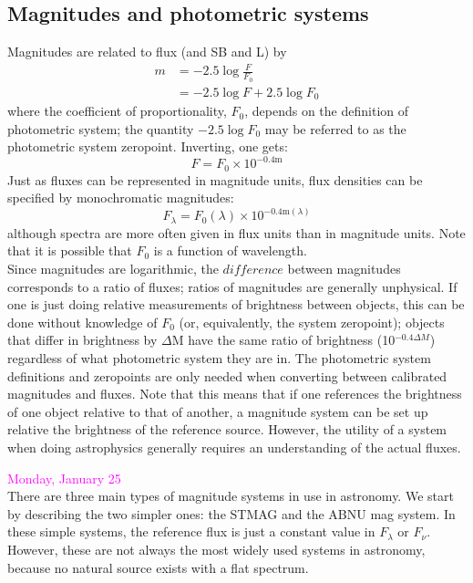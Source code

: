 \documentclass[12pt]{article}
\begin{document}
\subsection*{Magnitudes and photometric systems}
Magnitudes are related to flux (and SB and L) by
\begin{align*}
    m &= -2.5 \log \frac{F}{F_0}\\
      &= -2.5 \log F + 2.5 \log F_0
\end{align*}
where the coefficient of proportionality, $F_0$, depends on the definition
of photometric system; the quantity $-2.5 \log F_0$ may be referred to as
the photometric system zeropoint. Inverting, one gets:
\begin{equation*}
    F = F_0 \times 10^{-0.4\textrm{m}}
\end{equation*}
Just as fluxes can be represented in magnitude units, flux densities can be
specified by monochromatic magnitudes:
\begin{equation*}
    F_{\lambda} = F_0 (\lambda) \times 10^{-0.4 \textrm{m}(\lambda)}
\end{equation*}
although spectra are more often given in flux units than in magnitude units.
Note that it is possible that $F_0$ is a function of wavelength.\\

\noindent Since magnitudes are logarithmic, the $difference$ between
magnitudes corresponds to a ratio of fluxes; ratios of magnitudes are
generally unphysical. If one is just doing relative measurements of
brightness between objects, this can be done without knowledge of $F_0$
(or, equivalently, the system zeropoint); objects that differ in brightness
by $\Delta$M have the same ratio of brightness (10$^{-0.4 \Delta M}$)
regardless of what photometric system they are in. The photometric system
definitions and zeropoints are only needed when converting between calibrated
magnitudes and fluxes. Note that this means that if one references the
brightness of one object relative to that of another, a magnitude system
can be set up relative the brightness of the reference source. However, the
utility of a system when doing astrophysics generally requires an
understanding of the actual fluxes.

\newpage
\noindent \textcolor{magenta}{Monday, January 25}\\

\noindent There are three main types of magnitude systems in use in astronomy.
We start by describing the two simpler ones: the STMAG and the ABNU mag system.
In these simple systems, the reference flux is just a constant value in
$F_{\lambda}$ or $F_{\nu}$. However, these are not always the most widely used
systems in astronomy, because no natural source exists with a flat spectrum.\\
\end{document}
